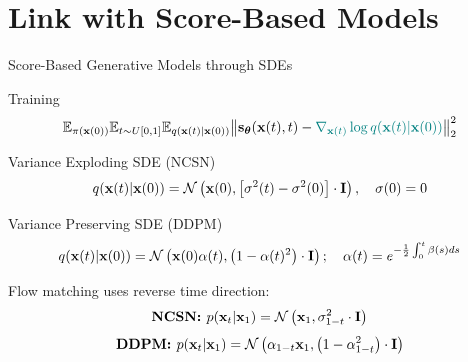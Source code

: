 \documentclass{beamer}
\begin{document}
\section{Link with Score-Based Models}
\begin{frame}{Score-Based Generative Models through SDEs}
	\vspace{-0.3cm}
	\begin{block}{Training}
		\vspace{-0.7cm}
		\[
			\mathbb{E}_{\pi(\mathbf{x}(0))} \mathbb{E}_{t \sim U[0, 1]} \mathbb{E}_{q(\mathbf{x}(t) | \mathbf{x}(0))}\bigl\| \mathbf{s}_{\boldsymbol{\theta}}(\mathbf{x}(t), t) - {\color{teal}\nabla_{\mathbf{x}(t)} \log q(\mathbf{x}(t) | \mathbf{x}(0))} \bigr\|^2_2 
		\]
		\vspace{-0.5cm}
	\end{block}
	\eqpause
	\begin{block}{Variance Exploding SDE (NCSN)}
		\vspace{-0.3cm}
		\[
			q(\mathbf{x}(t) | \mathbf{x}(0)) = \mathcal{N}\left(\mathbf{x}(0), \left[\sigma^2(t) - \sigma^2(0)\right] \cdot \mathbf{I}\right), \quad \sigma(0) =0
		\]
		\vspace{-0.5cm}
	\end{block}
	\begin{block}{Variance Preserving SDE (DDPM)}
		\vspace{-0.5cm}
		\[
			q(\mathbf{x}(t) | \mathbf{x}(0)) = \mathcal{N}\left(\mathbf{x}(0) \alpha(t), \left(1 - \alpha(t)^2\right) \cdot \mathbf{I}\right); \quad \alpha(t) = e^{-\frac{1}{2} \int_0^t \beta(s) ds}
		\]
		\vspace{-0.5cm}
	\end{block}
	\eqpause
	Flow matching uses reverse time direction:
	\[
		\textbf{NCSN: } p(\mathbf{x}_t | \mathbf{x}_1) = \mathcal{N}\left(\mathbf{x}_1, \sigma^2_{1-t} \cdot \mathbf{I}\right)
	\]
	\vspace{-0.5cm}
	\[
		\textbf{DDPM: } p(\mathbf{x}_t | \mathbf{x}_1) = \mathcal{N}\left(\alpha_{1-t} \mathbf{x}_1, \left(1 - \alpha_{1-t}^2\right) \cdot \mathbf{I}\right)
	\]
	\vspace{-0.5cm}
\end{frame}
\end{document}
